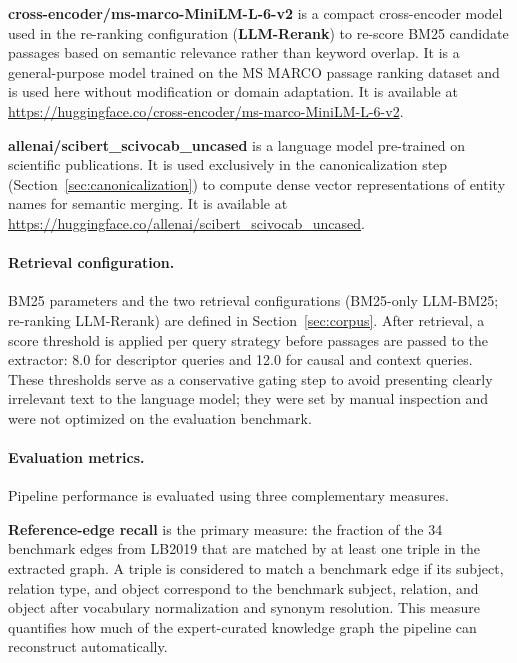 \documentclass[10pt]{article}
\begin{document}
\textbf{cross-encoder/ms-marco-MiniLM-L-6-v2}
\citep{bajaj2016ms} is a compact cross-encoder model used in
the re-ranking configuration (\textbf{LLM-Rerank}) to re-score BM25 candidate
passages based on semantic relevance rather than keyword
overlap.
It is a general-purpose model trained on the MS MARCO passage
ranking dataset and is used here without modification or
domain adaptation.
It is available at
\url{https://huggingface.co/cross-encoder/ms-marco-MiniLM-L-6-v2}.

\textbf{allenai/scibert\_scivocab\_uncased}
\citep{beltagy2019scibertpretrainedlanguagemodel} is a
language model pre-trained on scientific publications.
It is used exclusively in the canonicalization step
(Section~\ref{sec:canonicalization}) to compute dense
vector representations of entity names for semantic merging.
It is available at
\url{https://huggingface.co/allenai/scibert_scivocab_uncased}.

\paragraph{Retrieval configuration.}

BM25 parameters and the two retrieval configurations (BM25-only
LLM-BM25; re-ranking LLM-Rerank) are defined in Section~\ref{sec:corpus}.
After retrieval, a score threshold is applied per query
strategy before passages are passed to the extractor: 8.0 for
descriptor queries and 12.0 for causal and context queries.
These thresholds serve as a conservative gating step to avoid
presenting clearly irrelevant text to the language model; they
were set by manual inspection and were not optimized on the
evaluation benchmark.

\paragraph{Evaluation metrics.}

Pipeline performance is evaluated using three complementary
measures.

\textbf{Reference-edge recall} is the primary measure: the
fraction of the 34 benchmark edges from LB2019 that are
matched by at least one triple in the extracted graph.
A triple is considered to match a benchmark edge if its
subject, relation type, and object correspond to the
benchmark subject, relation, and object after vocabulary
normalization and synonym resolution.
This measure quantifies how much of the expert-curated
knowledge graph the pipeline can reconstruct automatically.
\end{document}
